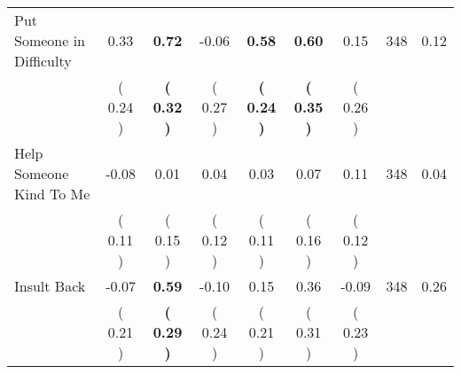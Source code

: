\begin{tabular}{lcccccccc}
Put Someone in Difficulty &      0.33 & \textbf{     0.72} &     -0.06 & \textbf{     0.58} & \textbf{     0.60} &      0.15 & 348 &       0.12 \\ 
 & (     0.24 ) & \textbf{(     0.32 )} & (     0.27 ) & \textbf{(     0.24 )} & \textbf{(     0.35 )} & (     0.26 ) & \\
Help Someone Kind To Me &     -0.08 &      0.01 &      0.04 &      0.03 &      0.07 &      0.11 & 348 &       0.04 \\ 
 & (     0.11 ) & (     0.15 ) & (     0.12 ) & (     0.11 ) & (     0.16 ) & (     0.12 ) & \\
Insult Back &     -0.07 & \textbf{     0.59} &     -0.10 &      0.15 &      0.36 &     -0.09 & 348 &       0.26 \\ 
 & (     0.21 ) & \textbf{(     0.29 )} & (     0.24 ) & (     0.21 ) & (     0.31 ) & (     0.23 ) & \\
\bottomrule
\end{tabular}

